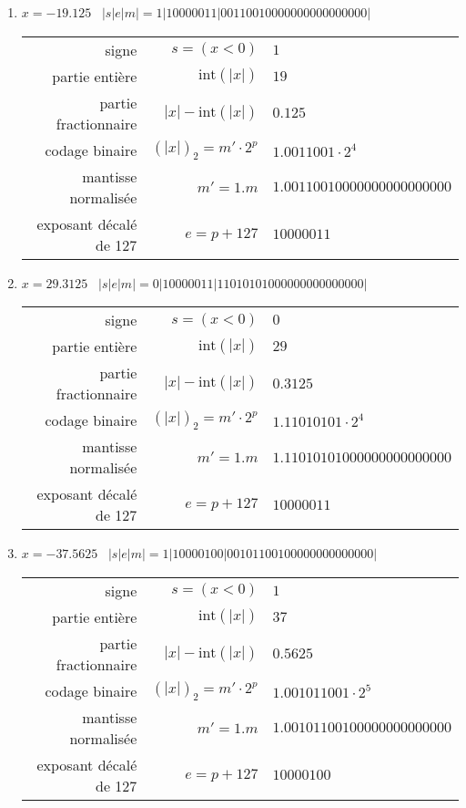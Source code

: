 \documentclass[11pt,a4paper]{article}
\begin{document}
\begin{enumerate}
\item $x = -19.125$ \dotfill\ {$|s|e|m| = 1|10000011|00110010000000000000000|$}
{\footnotesize
\begin{tabular}{r@{ : }r@{ $=$ }l}
signe 					& $s = (x < 0)$ 			& $1$ \\
partie entière 			& $\mbox{int}(|x|)$ 		& $19$ \\
partie fractionnaire 	& $|x| - \mbox{int}(|x|)$ 	& $0.125$ \\
codage binaire 			& $(|x|)_2 = m'\cdot 2^p$   & $1.0011001 \cdot 2^{4}$ \\
mantisse normalisée 	& $m' = 1.m$ 				& $1.00110010000000000000000$ \\
exposant décalé de 127 	& $e = p+127$ 				& $10000011$ \\[2mm]
\end{tabular}
}

\newpage
\item $x = 29.3125$ \dotfill\ {$|s|e|m| = 0|10000011|11010101000000000000000|$}
{\footnotesize
\begin{tabular}{r@{ : }r@{ $=$ }l}
signe 					& $s = (x < 0)$ 			& $0$ \\
partie entière 			& $\mbox{int}(|x|)$ 		& $29$ \\
partie fractionnaire 	& $|x| - \mbox{int}(|x|)$ 	& $0.3125$ \\
codage binaire 			& $(|x|)_2 = m'\cdot 2^p$   & $1.11010101 \cdot 2^{4}$ \\
mantisse normalisée 	& $m' = 1.m$ 				& $1.11010101000000000000000$ \\
exposant décalé de 127 	& $e = p+127$ 				& $10000011$ \\[2mm]
\end{tabular}
}

\item $x = -37.5625$ \dotfill\ {$|s|e|m| = 1|10000100|00101100100000000000000|$}
{\footnotesize
\begin{tabular}{r@{ : }r@{ $=$ }l}
signe 					& $s = (x < 0)$ 			& $1$ \\
partie entière 			& $\mbox{int}(|x|)$ 		& $37$ \\
partie fractionnaire 	& $|x| - \mbox{int}(|x|)$ 	& $0.5625$ \\
codage binaire 			& $(|x|)_2 = m'\cdot 2^p$   & $1.001011001 \cdot 2^{5}$ \\
mantisse normalisée 	& $m' = 1.m$ 				& $1.00101100100000000000000$ \\
exposant décalé de 127 	& $e = p+127$ 				& $10000100$ \\[2mm]
\end{tabular}
}


\end{enumerate}
\end{document}
